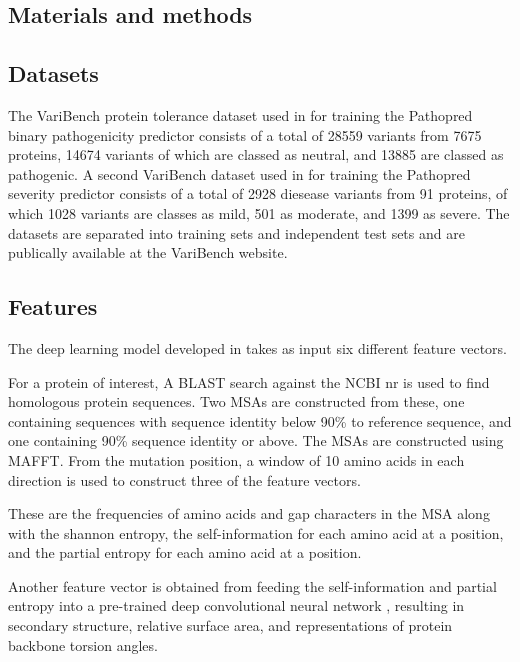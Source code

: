 \documentclass{bioinfo}
\begin{document}
\begin{methods}

\section{Materials and methods}

\subsection{Datasets}

The VariBench protein tolerance dataset used in \citep{Kvist2018} for training the Pathopred binary pathogenicity predictor consists of a total of 28559 variants from 7675 proteins, 14674 variants of which are classed as neutral, and 13885 are classed as pathogenic. A second VariBench dataset used in \citep{Kvist2018} for training the Pathopred severity predictor consists of a total of 2928 diesease variants from 91 proteins, of which 1028 variants are classes as mild, 501 as moderate, and 1399 as severe. The datasets are separated into training sets and independent test sets and are publically available at the VariBench website.

\subsection{Features}

The deep learning model developed in \citep{Kvist2018} takes as input six different feature vectors.

For a protein of interest, A BLAST search against the NCBI nr is used to find homologous protein sequences. Two MSAs are constructed from these, one containing sequences with sequence identity below 90\% to reference sequence, and one containing 90\% sequence identity or above. The MSAs are constructed using MAFFT. From the mutation position, a window of 10 amino acids in each direction is used to construct three of the feature vectors. 

These are the frequencies of amino acids and gap characters in the MSA along with the shannon entropy, the self-information \citep{Hurtado2018} for each amino acid at a position, and the partial entropy \citep{Hurtado2018} for each amino acid at a position.

Another feature vector is obtained from feeding the self-information and partial entropy into a pre-trained deep convolutional neural network \citep{Hurtado2018}, resulting in secondary structure, relative surface area, and representations of protein backbone torsion angles.


\end{methods}
\end{document}
